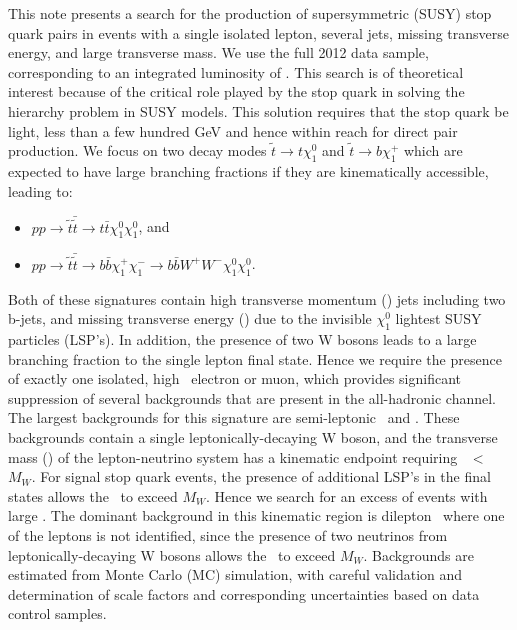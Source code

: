 
This note presents a search for the production of supersymmetric (SUSY) stop quark pairs in events with a 
single isolated lepton, several jets, missing transverse energy, and large transverse mass. We use the full 
2012 data sample, corresponding to an integrated luminosity of \lumi. 
This search is of theoretical interest because of the critical role played 
by the stop quark in solving the hierarchy problem in SUSY models. This solution requires that the stop quark 
be light, less than a few hundred GeV and hence within reach for direct pair production. We focus on two decay modes 
$\tilde{t}\rightarrow t\chi^0_1$ and $\tilde{t}\rightarrow b \chi^+_1$  which are expected
to have large branching fractions if they are kinematically accessible, leading to:

\begin{itemize}
\item $pp\rightarrow\tilde{t}\bar{\tilde{t}}\rightarrow t\bar{t}\chi^0_1\chi^0_1$, and
\item $pp\rightarrow\tilde{t}\bar{\tilde{t}}\rightarrow b\bar{b}\chi^+_1\chi^-_1 \rightarrow b\bar{b}W^+W^-\chi^0_1\chi^0_1$.
\end{itemize}

Both of these signatures contain high transverse momentum (\pt) jets including two b-jets, and missing transverse 
energy (\met) due to the invisible $\chi^0_1$ lightest SUSY particles (LSP's). In addition, the presence of
two W bosons leads to a large branching fraction to the single lepton final state. Hence we require the presence
of exactly one isolated, high \pt\ electron or muon, which provides significant suppression of several backgrounds
that are present in the all-hadronic channel. The largest backgrounds for this signature are semi-leptonic \ttbar\
and \wjets. These backgrounds contain a single leptonically-decaying W boson, and the transverse mass (\mt)
of the lepton-neutrino system has a kinematic endpoint requiring \mt\ $<$ $M_W$. For signal stop quark events,
the presence of additional LSP's in the final states allows the \mt\ to exceed $M_W$. Hence we search for an excess
of events with large \mt. The dominant background in this kinematic region is dilepton \ttbar\ where one of the
leptons is not identified, since the presence of two neutrinos from leptonically-decaying W bosons allows the 
\mt\ to exceed $M_W$. Backgrounds are estimated from Monte Carlo (MC) simulation, with careful validation 
and determination of scale factors and corresponding uncertainties based on data control samples.

